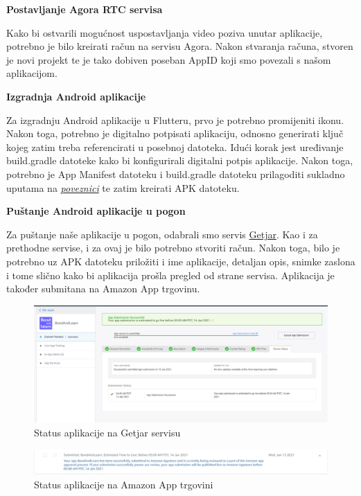 			\begin{flushleft}
				\textbf{Postavljanje Agora RTC servisa} 
			\end{flushleft}
		
			\text Kako bi ostvarili mogućnost uspostavljanja video poziva unutar aplikacije, potrebno je bilo kreirati račun na servisu Agora. Nakon stvaranja računa, stvoren je novi projekt te je tako dobiven poseban AppID koji smo povezali s našom aplikacijom.  
			
			\begin{flushleft}
				\textbf{Izgradnja Android aplikacije} 
			\end{flushleft}
			
			\text Za izgradnju Android aplikacije u Flutteru, prvo je potrebno promijeniti ikonu. Nakon toga, potrebno je digitalno potpisati aplikaciju, odnosno generirati ključ kojeg zatim treba referencirati u posebnoj datoteka. Idući korak jest uređivanje build.gradle datoteke kako bi konfigurirali digitalni potpis aplikacije. Nakon toga, potrebno je App Manifest datoteku i build.gradle datoteku prilagoditi sukladno uputama na \textit{\href{https://flutter.dev/docs/deployment/android}{poveznici}} te  zatim kreirati APK datoteku. 
			
			\begin{flushleft}
				\textbf{Puštanje Android aplikacije u pogon} 
			\end{flushleft}
			
			\text Za puštanje naše aplikacije u pogon, odabrali smo servis \href{https://developer.getjar.mobi/}{Getjar}. Kao i za prethodne servise, i za ovaj je bilo potrebno stvoriti račun. Nakon toga, bilo je potrebno uz APK datoteku priložiti i ime aplikacije, detaljan opis, snimke zaslona i tome slično kako bi aplikacija prošla pregled od strane servisa. Aplikacija je također submitana na Amazon App trgovinu. 
			\eject
			\begin{figure}[h]
				\includegraphics[scale=0.3]{slike/Getjar.PNG}
				\centering
				\caption{Status aplikacije na Getjar servisu}
				\label{fig:Getjar}
			\end{figure}
			
			\begin{figure}[h]
				\includegraphics[scale=0.2]{slike/Amazon.JPEG}
				\centering
				\caption{Status aplikacije na Amazon App trgovini}
				\label{fig:Amazon}
			\end{figure}
			
			\eject 